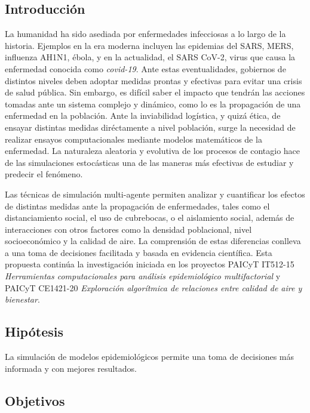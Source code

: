 \documentclass{sciposter}
\begin{document}
\begin{multicols}{2}

\section{Introducción}
La humanidad ha sido asediada por enfermedades infecciosas a lo largo de la historia. Ejemplos en la era moderna incluyen las epidemias del SARS, MERS, influenza AH1N1, ébola, y en la actualidad, el SARS CoV-2, virus que causa la enfermedad conocida como \emph{covid-19}. Ante estas eventualidades, gobiernos de distintos niveles deben adoptar medidas prontas y efectivas para evitar una crisis de salud pública. Sin embargo, es difícil saber el impacto que tendrán las acciones tomadas ante un sistema complejo y dinámico, como lo es la propagación de una enfermedad en la población. Ante la inviabilidad logística, y quizá ética, de ensayar distintas medidas diréctamente a nivel población, surge la necesidad de realizar ensayos computacionales mediante modelos matemáticos de la enfermedad. La naturaleza aleatoria y evolutiva de los procesos de contagio hace de las simulaciones estocásticas una de las maneras más efectivas de estudiar y predecir el fenómeno.

Las técnicas de simulación multi-agente permiten analizar y cuantificar los efectos de distintas medidas ante la propagación de enfermedades, tales como el distanciamiento social, el uso de cubrebocas, o el aislamiento social, además de interacciones con otros factores como la densidad poblacional, nivel socioeconómico y la calidad de aire. La comprensión de estas diferencias conlleva a una toma de decisiones facilitada y basada en evidencia científica. Esta propuesta continúa la investigación iniciada en los proyectos PAICyT IT512-15 \emph{Herramientas computacionales para análisis epidemiológico multifactorial} y PAICyT CE1421-20 \emph{Exploración algorítmica de relaciones entre calidad de aire y bienestar}.

\subsection*{Hipótesis}

La simulación de modelos epidemiológicos permite una toma de decisiones más informada y con mejores resultados.

\subsection*{Objetivos}


\end{multicols}
\end{document}
